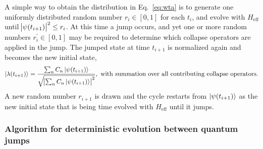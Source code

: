\documentclass[times,sort&compress,final]{elsarticle}
\begin{document}
A simple way to obtain the distribution in Eq.~\eqref{eq:wta} is to generate one uniformly distributed 
random number $r_i \in [0,1]$ for each $t_i$, and evolve with $H_\text{eff}$ until 
$ \abs{ \psi(t_{i+1}) }^2 \le r_i$. 
At this time a jump occurs, and yet one or more random numbers $r_i^\prime \in [0,1]$ may be required to determine 
which collapse operators are applied in the jump. 
The jumped state at time $t_{i+1}$ is normalized again and becomes the new initial state,
\begin{equation}
\ket{ \lambda(t_{i+1})} 
= \frac{\sum_n C_n\ket{ \psi(t_{i+1})}}{\sqrt{\abs{\sum_n C_n\ket{ \psi(t_{i+1})}}^2 }}, 
~\text{with summation over all contributing collapse operators}.
\end{equation}
A new random number $r_{i+1}$ is drawn and the cycle restarts from $\ket{\psi(t_{i+1}) }$ 
as the new initial state that is being time evolved with $H_\text{eff}$ until it jumps. 

\subsubsection{Algorithm for deterministic evolution between quantum jumps}
\label{sec:splitstep}
\end{document}
